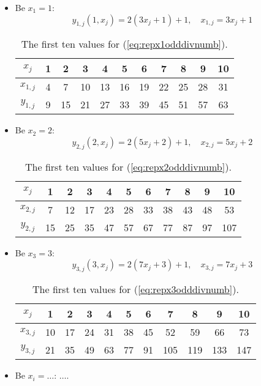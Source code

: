 \begin{itemize}
	\item Be $x_{1} = 1$:
		\begin{equation}
			y_{1,j}\left(1,x_{j}\right) = 2\left(3x_{j} + 1\right) + 1, \quad x_{1,j} = 3x_{j} + 1
		\label{eq:repx1odddivnumb}
		\end{equation}

		\begin{table}[H]
		\centering
		\caption{The first ten values for (\ref{eq:repx1odddivnumb}).}
		\begin{tabular}{c|cccccccccc}
  			$x_{j}$ & 1 & 2 & 3 & 4 & 5 & 6 & 7 & 8 & 9 & 10 \\
  		\hline	$x_{1,j}$ & 4 & 7 & 10 & 13 & 16 & 19 & 22 & 25 & 28 & 31 \\
  			$y_{1,j}$ & 9 & 15 & 21 & 27 & 33 & 39 & 45 & 51 & 57 & 63 \\
		\end{tabular}
		\label{tab:repoddivnumbx1}
		\end{table}

	\item Be $x_{2} = 2$:
		\begin{equation}
			y_{2,j}\left(2,x_{j}\right) = 2\left(5x_{j} + 2\right) + 1, \quad x_{2,j} = 5x_{j} + 2
		\label{eq:repx2odddivnumb}
		\end{equation}

		\begin{table}[H]
		\centering
		\caption{The first ten values for (\ref{eq:repx2odddivnumb}).}
		\begin{tabular}{c|cccccccccc}
  			$x_{j}$ & 1 & 2 & 3 & 4 & 5 & 6 & 7 & 8 & 9 & 10 \\
  		\hline	$x_{2,j}$ & 7 & 12 & 17 & 23 & 28 & 33 & 38 & 43 & 48 & 53 \\
  			$y_{2,j}$ & 15 & 25 & 35 & 47 & 57 & 67 & 77 & 87 & 97 & 107 \\
		\end{tabular}
		\label{tab:repoddivnumbx2}
		\end{table}
	
	\item Be $x_{3} = 3$:
		\begin{equation}
			y_{3,j}\left(3,x_{j}\right) = 2\left(7x_{j} + 3\right) + 1, \quad x_{3,j} = 7x_{j} + 3
		\label{eq:repx3odddivnumb}
		\end{equation}

		\begin{table}[H]
		\centering
		\caption{The first ten values for (\ref{eq:repx3odddivnumb}).}
		\begin{tabular}{c|cccccccccc}
  			$x_{j}$ & 1 & 2 & 3 & 4 & 5 & 6 & 7 & 8 & 9 & 10 \\
  		\hline	$x_{3,j}$ & 10 & 17 & 24 & 31 & 38 & 45 & 52 & 59 & 66 & 73 \\
  			$y_{3,j}$ & 21 & 35 & 49 & 63 & 77 & 91 & 105 & 119 & 133 & 147 \\
		\end{tabular}
		\label{tab:repoddivnumbx3}
		\end{table}
	\item Be $x_{i} = \dots$: $\dots$.
\label{it:repodddivnumb}
\end{itemize}

